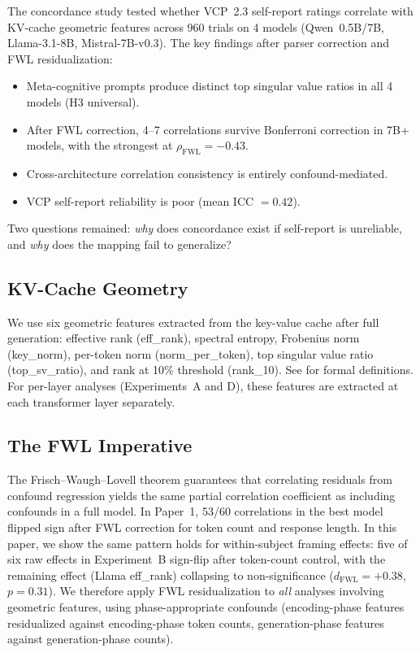 \documentclass[11pt,a4paper]{article}
\begin{document}
The concordance study \citep{lyra2026concordance} tested whether VCP~2.3 self-report ratings \citep{watson2025interiora} correlate with KV-cache geometric features across 960 trials on 4 models (Qwen~0.5B/7B, Llama-3.1-8B, Mistral-7B-v0.3). The key findings after parser correction and FWL residualization:

\begin{itemize}
    \item Meta-cognitive prompts produce distinct top singular value ratios in all 4 models (H3 universal).
    \item After FWL correction, 4--7 correlations survive Bonferroni correction in 7B+ models, with the strongest at $\rho_{\text{FWL}} = -0.43$.
    \item Cross-architecture correlation consistency is entirely confound-mediated.
    \item VCP self-report reliability is poor (mean ICC $= 0.42$).
\end{itemize}

Two questions remained: \emph{why} does concordance exist if self-report is unreliable, and \emph{why} does the mapping fail to generalize?

\subsection{KV-Cache Geometry}

We use six geometric features extracted from the key-value cache after full generation: effective rank (eff\_rank), spectral entropy, Frobenius norm (key\_norm), per-token norm (norm\_per\_token), top singular value ratio (top\_sv\_ratio), and rank at 10\% threshold (rank\_10). See \citet{lyra2026concordance} for formal definitions. For per-layer analyses (Experiments~A and D), these features are extracted at each transformer layer separately.

\subsection{The FWL Imperative}

The Frisch--Waugh--Lovell theorem guarantees that correlating residuals from confound regression yields the same partial correlation coefficient as including confounds in a full model. In Paper~1, 53/60 correlations in the best model flipped sign after FWL correction for token count and response length. In this paper, we show the same pattern holds for within-subject framing effects: five of six raw effects in Experiment~B sign-flip after token-count control, with the remaining effect (Llama eff\_rank) collapsing to non-significance ($d_{\text{FWL}} = +0.38$, $p = 0.31$). We therefore apply FWL residualization to \emph{all} analyses involving geometric features, using phase-appropriate confounds (encoding-phase features residualized against encoding-phase token counts, generation-phase features against generation-phase counts).
\end{document}
